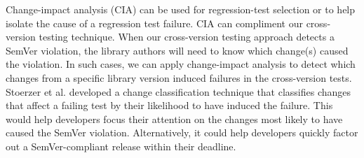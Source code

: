 Change-impact analysis (CIA) \cite{Chianti,FaultTracer,Stoerzer} can be
used for regression-test selection or to help isolate the cause of a
regression test failure.
%
CIA can compliment our cross-version testing technique.
%
When our cross-version testing approach detects a SemVer violation,
the library authors will need to know which change(s) caused the
violation. In such cases, we can apply change-impact analysis to detect
which changes from a specific library version induced failures in the
cross-version tests. Stoerzer et al. \cite{Stoerzer} developed a change
classification technique that classifies changes that affect a failing
test by their likelihood to have induced the failure. This would help
developers focus their attention on the changes most likely to have
caused the SemVer violation. Alternatively, it could help developers
quickly factor out a SemVer-compliant release within their deadline.
